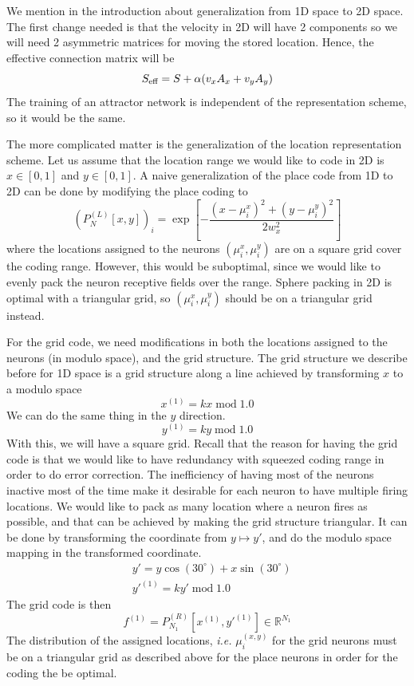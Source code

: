 We mention in the introduction about generalization from 1D space to 2D space. The first change needed is that the velocity in 2D will have 2 components so we will need 2 asymmetric matrices for moving the stored location. Hence, the effective connection matrix will be
\begin{equation}
S_{\text{\scriptsize{eff}}} = S + \alpha (v_x A_x + v_y A_y)
\end{equation}
The training of an attractor network is independent of the representation scheme, so it would be the same.

The more complicated matter is the generalization of the location representation scheme. Let us assume that the location range we would like to code in 2D is $x \in [0, 1]$ and $y \in [0, 1]$. A naive generalization of the place code from 1D to 2D can be done by modifying the place coding to
\begin{equation}
\left( P^{(L)}_N[x, y] \right)_i = \exp\left[
	-\frac{(x - \mu^x_i)^2 + (y - \mu^y_i)^2}{2w_x^2}
\right]
\end{equation}
where the locations assigned to the neurons $(\mu^x_i, \mu^y_i)$ are on a square grid cover the coding range. However, this would be suboptimal, since we would like to evenly pack the neuron receptive fields over the range. Sphere packing in 2D is optimal with a triangular grid, so $(\mu^x_i, \mu^y_i)$ should be on a triangular grid instead.

For the grid code, we need modifications in both the locations assigned to the neurons (in modulo space), and the grid structure. The grid structure we describe before for 1D space is a grid structure along a line achieved by transforming $x$ to a modulo space
\begin{equation}
x^{(1)} = kx \;\text{mod}\; 1.0
\end{equation}
We can do the same thing in the $y$ direction.
\begin{equation}
y^{(1)} = ky \;\text{mod}\; 1.0
\end{equation}
With this, we will have a square grid. Recall that the reason for having the grid code is that we would like to have redundancy with squeezed coding range in order to do error correction. The inefficiency of having most of the neurons inactive most of the time make it desirable for each neuron to have multiple firing locations. We would like to pack as many location where a neuron fires as possible, and that can be achieved by making the grid structure triangular. It can be done by transforming the coordinate from $y\mapsto y'$, and do the modulo space mapping in the transformed coordinate.
\begin{align}
&y' = y\cos( 30^{\circ} ) + x\sin( 30^{\circ} ) \\
&y'^{(1)} = ky' \;\text{mod}\; 1.0
\end{align}
The grid code is then
\begin{equation}
f^{(1)} = P^{(R)}_{N_1}[x^{(1)}, y'^{(1)}] \in \mathbb{R}^{N_1}
\end{equation}
The distribution of the assigned locations, \textit{i.e.} $\mu^{(x,y)}_i$ for the grid neurons must be on a triangular grid as described above for the place neurons in order for the coding the be optimal.


